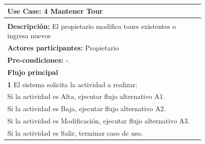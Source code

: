 \documentclass[12pt,a4paper,titlepage,oneside]{article}
\begin{document}
\begin{tabular}{| l | p{0.8\linewidth} |} \hline
	\multicolumn{2}{|p{0.8\linewidth}|}{\textbf{Use Case:} 4 Mantener Tour} \\\hline
	\multicolumn{2}{|c|}{} \\ \hline
	\multicolumn{2}{|p{0.8\linewidth}|}{\textbf{Descripci\'on:} El propietario modifica tours existentes o ingresa nuevos} \\ \hline
	\multicolumn{2}{|p{0.8\linewidth}|}{\textbf{Actores participantes:} Propietario} \\ \hline
	\multicolumn{2}{|p{0.8\linewidth}|}{\textbf{Pre-condiciones:} -.} \\ 			    \hline
		\multicolumn{2}{|p{0.8\linewidth}|}{\textbf{Flujo principal}} \\ \hline
	\multicolumn{2}{|p{0.8\linewidth}|}{\textbf{1}  El sistema solicita la actividad a realizar: } \\ \hline
	\multicolumn{2}{|p{0.8\linewidth}|}{  Si la actividad es Alta, ejecutar flujo alternativo A1.} \\ \hline
	\multicolumn{2}{|p{0.8\linewidth}|}{  Si la actividad es Baja, ejecutar flujo alternativo A2.} \\ \hline
		\multicolumn{2}{|p{0.8\linewidth}|}{  Si la actividad es Modificación, ejecutar flujo alternativo A3.} \\ \hline
		\multicolumn{2}{|p{0.8\linewidth}|}{  Si la actividad es Salir, terminar caso de uso.} \\ \hline


\end{tabular}
\end{document}
